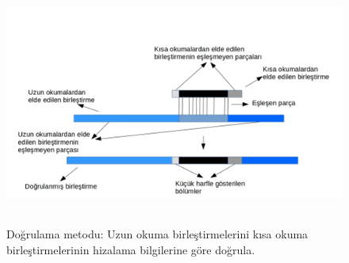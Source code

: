 \begin{figure}[htbp]
\begin{center}
  \includegraphics[width=14cm, height=8cm]{BACAlgorithmTurkce.jpg}
\end{center}
  \caption{Doğrulama metodu: Uzun okuma birleştirmelerini kısa okuma birleştirmelerinin hizalama bilgilerine göre doğrula.}
  \label{correction}
\end{figure}







